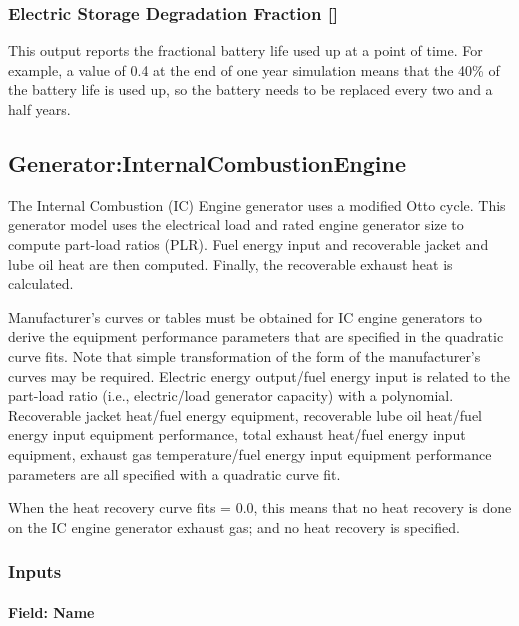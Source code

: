 \subsubsection{Electric Storage Degradation Fraction {[]}}\label{electric-storage-degradation-fraction}

This output reports the fractional battery life used up at a point of time. For example, a value of 0.4 at the end of one year simulation means that the 40\% of the battery life is used up, so the battery needs to be replaced every two and a half years.

\subsection{Generator:InternalCombustionEngine}\label{generatorinternalcombustionengine}

The Internal Combustion (IC) Engine generator uses a modified Otto cycle. This generator model uses the electrical load and rated engine generator size to compute part-load ratios (PLR). Fuel energy input and recoverable jacket and lube oil heat are then computed. Finally, the recoverable exhaust heat is calculated.

Manufacturer's curves or tables must be obtained for IC engine generators to derive the equipment performance parameters that are specified in the quadratic curve fits. Note that simple transformation of the form of the manufacturer's curves may be required. Electric energy output/fuel energy input is related to the part-load ratio (i.e., electric/load generator capacity) with a polynomial. Recoverable jacket heat/fuel energy equipment, recoverable lube oil heat/fuel energy input equipment performance, total exhaust heat/fuel energy input equipment, exhaust gas temperature/fuel energy input equipment performance parameters are all specified with a quadratic curve fit.

When the heat recovery curve fits = 0.0, this means that no heat recovery is done on the IC engine generator exhaust gas; and no heat recovery is specified.

\subsubsection{Inputs}\label{inputs-7-007}

\paragraph{Field: Name}\label{field-name-8-004}

